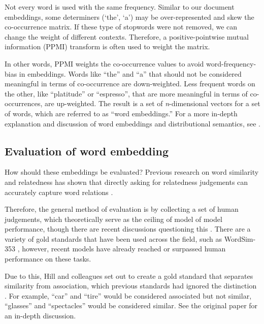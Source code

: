 Not every word is used with the same frequency. Similar to our document embeddings, some determiners (`the', `a') may be over-represented and skew the co-occurrence matrix. If these type of stopwords were not removed, we can change the weight of different contexts. Therefore, a positive-pointwise mutual information (PPMI) transform is often used to weight the matrix. 

In other words, PPMI weights the co-occurrence values to avoid word-frequency-bias in embeddings. Words like ``the'' and ``a'' that should not be considered meaningful in terms of co-occurrence are down-weighted. Less frequent words on the other, like ``platitude'' or ``espresso'', that are more meaningful in terms of co-occurrences, are up-weighted. The result is a set of \textit{n}-dimensional vectors for a set of words, which are referred to as ``word embeddings.'' For a more in-depth explanation and discussion of word embeddings and distributional semantics, see \cite{lenci2018distributional}.


\subsection{Evaluation of word embedding}

How should these embeddings be evaluated? Previous research on word similarity and relatedness has shown that directly asking for relatedness judgements can accurately capture word relations \cite{finkelstein2001placing}.

Therefore, the general method of evaluation is by collecting a set of human judgements, which theoretically serve as the ceiling of model of model performance, though there are recent discussions questioning this \cite{richie2022inter}.
There are a variety of gold standards that have been used across the field, such as WordSim-353 \cite{finkelstein2001placing, agirre2009study}, however, recent models have already reached or surpassed human performance on these tasks.

Due to this, Hill and colleagues set out to create a gold standard that separates similarity from association, which previous standards had ignored the distinction \cite{hill2015simlex}.
For example, ``car'' and ``tire'' would be considered associated but not similar, ``glasses'' and ``spectacles'' would be considered similar. See the original paper for an in-depth discussion.

